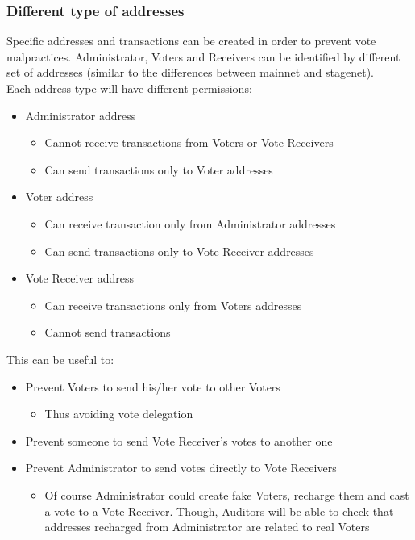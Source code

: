 \documentclass[10pt, letterpaper]{article}
\begin{document}
\subsubsection{Different type of addresses}
Specific addresses and transactions can be created in order to prevent vote malpractices. Administrator, Voters and Receivers can be identified by different set of addresses (similar to the differences between mainnet and stagenet).\\
Each address type will have different permissions:
\begin{itemize}
\item Administrator address
\begin{itemize}
\item Cannot receive transactions from Voters or Vote Receivers
\item Can send transactions only to Voter addresses
\end{itemize}
\item Voter address
\begin{itemize}
\item Can receive transaction only from Administrator addresses
\item Can send transactions only to Vote Receiver addresses
\end{itemize}
\item Vote Receiver address
\begin{itemize}
\item Can receive transactions only from Voters addresses
\item Cannot send transactions
\end{itemize}
\end{itemize}

This can be useful to: 
\begin{itemize}
\item Prevent Voters to send his/her vote to other Voters
\begin{itemize}
\item Thus avoiding vote delegation 
\end{itemize}
\item Prevent someone to send Vote Receiver’s votes to another one
\item Prevent Administrator to send votes directly to Vote Receivers
\begin{itemize}
\item Of course Administrator could create fake Voters, recharge them and cast a vote to a Vote Receiver. Though, Auditors will be able to check that addresses recharged from Administrator are related to real Voters
\end{itemize}
\end{itemize}
\end{document}
